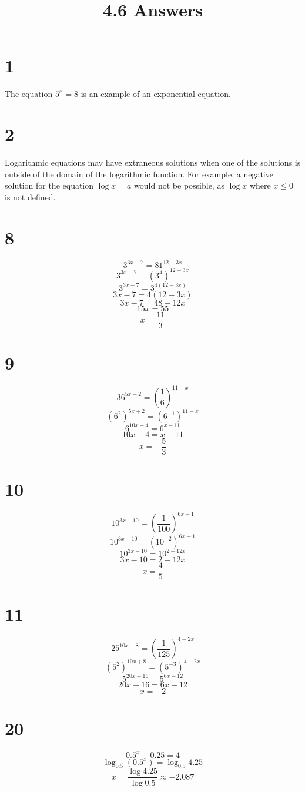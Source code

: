 \documentclass{article}
\title{4.6 Answers}
\theoremstyle{definition}
\newcommand{\?}{\stackrel{?}{=}}
\begin{document}
\maketitle

\section*{1}
The equation $5^x=8$ is an example of an exponential equation.

\section*{2}
Logarithmic equations may have extraneous solutions when one of the solutions is outside of the domain of the logarithmic function. For example, 
a negative solution for the equation $\log x=a$ would not be possible, as $\log x$ where $x\le 0$ is not defined.

\section*{8}
\[ 3^{3x-7}=81^{12-3x} \]
\[ 3^{3x-7}=(3^4)^{12-3x} \]
\[ 3^{3x-7}=3^{4(12-3x)} \]
\[ 3x-7=4(12-3x) \]
\[ 3x-7=48-12x \] \[ 15x=55 \] \[ x=\frac{11}{3} \]

\section*{9}
\[ 36^{5x+2}=(\frac{1}{6})^{11-x} \] \[ (6^2)^{5x+2}=(6^{-1})^{11-x} \] \[ 6^{10x+4}=6^{x-11} \] \[ 10x+4=x-11 \] \[ x=-\frac{5}{3} \]

\section*{10}
\[ 10^{3x-10}=(\frac{1}{100})^{6x-1} \] \[ 10^{3x-10}=(10^{-2})^{6x-1} \] \[ 10^{3x-10}=10^{2-12x} \] \[ 3x-10=2-12x \] \[ x=\frac{4}{5} \]

\section*{11}
\[ 25^{10x+8}=(\frac{1}{125})^{4-2x} \] \[ (5^2)^{10x+8}=(5^{-3})^{4-2x} \] \[ 5^{20x+16}=5^{6x-12} \] \[ 20x+16=6x-12 \] \[ x=-2 \]

\section*{20}
\[ 0.5^x-0.25=4 \] \[ \log_{0.5}(0.5^x)=\log_{0.5} 4.25 \] \[ x=\dfrac{\log{4.25}}{\log{0.5}}\approx -2.087 \]
\end{document}
